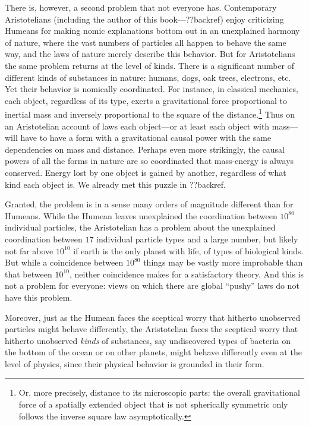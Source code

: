 There is, however, a second problem that not everyone has. Contemporary Aristotelians (including the author of this 
book---??backref) 
enjoy criticizing Humeans for making 
nomic explanations bottom out in an unexplained harmony of nature, where the vast numbers of particles all 
happen to behave the same way, and the laws of nature merely describe this behavior. But for Aristotelians the same problem returns 
at the level of kinds. There is a significant number of different kinds of 
substances in nature: humans, dogs, oak trees, electrons, etc. Yet their behavior is nomically coordinated. For instance,
in classical mechanics, each object, regardless of its type, exerts a gravitational force proportional to inertial mass
and inversely proportional to the square of the distance.\footnote{Or, more precisely, distance to its microscopic parts: the overall
gravitational force of a spatially extended object that is not spherically symmetric only follows the inverse square law 
asymptotically.}  Thus on an Aristotelian account of laws each object---or at 
least each object with mass---will have to have a form with a gravitational causal power with the same dependencies on 
mass and distance. Perhaps even more strikingly, the causal powers of all the forms in nature are so coordinated that 
mass-energy is always conserved. Energy lost by one object is gained by another, regardless of what kind each object 
is. We already met this puzzle in ??backref.

Granted, the problem is in a sense many orders of magnitude different than for Humeans. While the Humean leaves 
unexplained the coordination between $10^{80}$ individual particles, the Aristotelian has a problem about the 
unexplained coordination between $17$ individual particle types and a large number, but likely not far above $10^{10}$
if earth is the only planet with life, of types of biological kinds. But while a coincidence between $10^{80}$ things
may be vastly more improbable than that between $10^{10}$, neither coincidence makes for a satisfactory theory.
And this is not a problem for everyone: views on which there are global ``pushy'' laws do not have this problem. 

Moreover, just as the Humean faces the sceptical worry that hitherto unobserved particles might behave differently, 
the Aristotelian faces the sceptical worry that hitherto unobserved \textit{kinds} of substances, say undiscovered 
types of bacteria on the bottom of the ocean or on other planets, might behave differently even at the level of physics, 
since their physical behavior is grounded in their form. 

